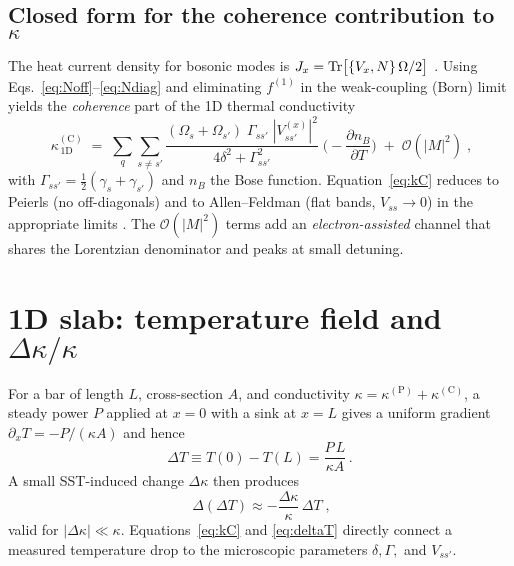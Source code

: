 \documentclass[aps,prb,preprint,amsmath,amssymb]{revtex4-2} %
\begin{document}
        \subsection{Closed form for the coherence contribution to $\kappa$}
            The heat current density for bosonic modes is $J_x= \Tr\!\big[ \{V_x, N\}\,\Omega/2 \big]$ \cite{Hardy1963,Simoncelli2019Unified}. Using Eqs.~\eqref{eq:Noff}--\eqref{eq:Ndiag} and eliminating $f^{(1)}$ in the weak-coupling (Born) limit yields the \emph{coherence} part of the 1D thermal conductivity
            \begin{equation}
                \boxed{\;\kappa^{(\mathrm C)}_{\!\,1\mathrm D}\;=\;\sum_{q}\sum_{s\neq s'} \frac{(\Omega_s+\Omega_{s'})\;\Gamma_{ss'}\; |V^{(x)}_{ss'}|^2}{4\delta^2+\Gamma_{ss'}^2}\;\bigg(-\frac{\partial n_B}{\partial T}\bigg)\; +\; \mathcal O(|M|^2)\;,}\label{eq:kC}
            \end{equation}
            with $\Gamma_{ss'}=\tfrac12(\gamma_s+\gamma_{s'})$ and $n_B$ the Bose function. Equation~\eqref{eq:kC} reduces to Peierls (no off-diagonals) and to Allen--Feldman (flat bands, $V_{ss}\!\to\!0$) in the appropriate limits \cite{Peierls1929,AllenFeldman1993,Simoncelli2019Unified}. The $\mathcal O(|M|^2)$ terms add an \emph{electron-assisted} channel that shares the Lorentzian denominator and peaks at small detuning.

    \section{1D slab: temperature field and $\Delta\kappa/\kappa$}
        For a bar of length $L$, cross-section $A$, and conductivity $\kappa=\kappa^{(\mathrm P)}+\kappa^{(\mathrm C)}$, a steady power $P$ applied at $x=0$ with a sink at $x=L$ gives a uniform gradient $\partial_x T = -P/(\kappa A)$ and hence
        \begin{equation}
            \Delta T \equiv T(0)-T(L) = \frac{P\,L}{\kappa A}\,.
        \end{equation}
        A small SST-induced change $\Delta\kappa$ then produces
        \begin{equation}
            \boxed{\;\Delta(\Delta T) \approx -\frac{\Delta\kappa}{\kappa}\,\Delta T\;,}\label{eq:deltaT}
        \end{equation}
        valid for $|\Delta\kappa|\ll\kappa$. Equations~\eqref{eq:kC} and \eqref{eq:deltaT} directly connect a measured temperature drop to the microscopic parameters $\delta,\Gamma,$ and $V_{ss'}$.
\end{document}
